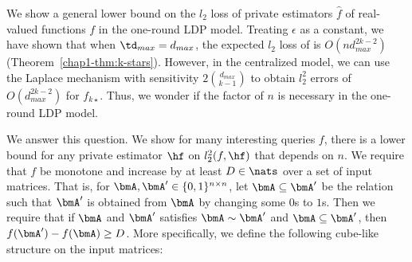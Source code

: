 We show a general lower bound on the $l_2$ loss of private estimators $\hat{f}$ of
real-valued functions $f$ in the one-round LDP model. Treating $\epsilon$ as a
constant, we have shown that 
when $\td_{max}=d_{max}$, 
the expected $l_2$ loss of  is 
$O(nd_{max}^{2k-2})$
(Theorem~\ref{chap1-thm:k-stars}). 
However, in
the centralized 
model, we can use
the Laplace mechanism with sensitivity 
$2\binom{d_{max}}{k-1}$ 
to obtain $l_2^2$ errors of $O(d_{max}^{2k-2})$ 
for $f_{k\star}$. 
Thus, we wonder
if 
the factor of $n$ is 
necessary 
in the one-round LDP model.

We 
answer this question.
We show for many interesting queries $f$, there is a lower bound for any private
estimator $\hf$ on $l_2^2(f, \hf)$ that depends on $n$.
% 
% 
We 
require that $f$ be monotone and increase by at least $D \in \nats$ over a set
of input matrices. 
That is, 
for $\bmA, \bmA' \in \{0,1\}^{n \times n}$, 
let $\bmA \subseteq \bmA'$ be the relation such that 
$\bmA'$ is obtained from $\bmA$ by changing some $0$s to $1$s. 
Then we require that 
if 
$\bmA$ and $\bmA'$ 
satisfies 
$\bmA \sim \bmA'$ and $\bmA \subseteq \bmA'$, then $f(\bmA') - f(\bmA) \geq D$.
More specifically, we define the following cube-like structure on the input matrices:

